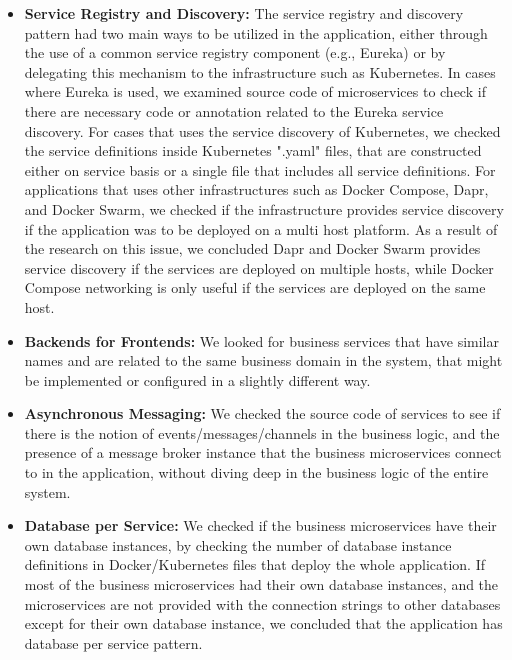 \documentclass{Configuration_Files/PoliMi3i_thesis}
\begin{document}
\begin{itemize}
\begin{itemize}
        \item \textbf{Service Registry and Discovery:} The service registry and discovery pattern had two main ways to be utilized in the application, either through the use of a common service registry component (e.g., Eureka) or by delegating this mechanism to the infrastructure such as Kubernetes.
        In cases where Eureka is used, we examined source code of microservices to check if there are necessary code or annotation related to the Eureka service discovery.
        For cases that uses the service discovery of Kubernetes, we checked the service definitions inside Kubernetes ".yaml" files, that are constructed either on service basis or a single file that includes all service definitions.
        For applications that uses other infrastructures such as Docker Compose, Dapr, and Docker Swarm, we checked if the infrastructure provides service discovery if the application was to be deployed on a multi host platform.
        As a result of the research on this issue, we concluded Dapr and Docker Swarm provides service discovery if the services are deployed on multiple hosts, while Docker Compose networking is only useful if the services are deployed on the same host.
        
        \item \textbf{Backends for Frontends:} We looked for business services that have similar names and are related to the same business domain in the system, that might be implemented or configured in a slightly different way.
        
        \item \textbf{Asynchronous Messaging:} We checked the source code of services to see if there is the notion of events/messages/channels in the business logic, and the presence of a message broker instance that the business microservices connect to in the application, without diving deep in the business logic of the entire system.
        
        \item \textbf{Database per Service:} We checked if the business microservices have their own database instances, by checking the number of database instance definitions in Docker/Kubernetes files that deploy the whole application.
        If most of the business microservices had their own database instances, and the microservices are not provided with the connection strings to other databases except for their own database instance, we concluded that the application has database per service pattern.
        

\end{itemize}
\end{itemize}
\end{document}
